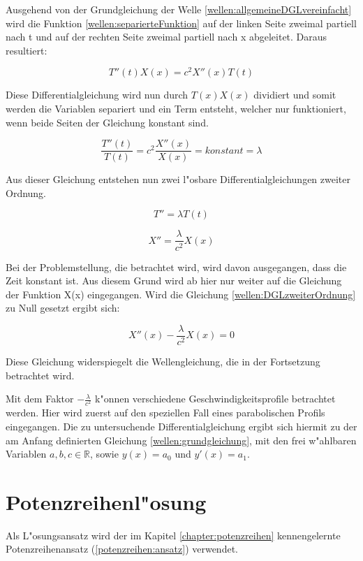 \begin{refsection}
Ausgehend von der Grundgleichung der Welle 
\ref{wellen:allgemeineDGLvereinfacht} wird die Funktion 
\ref{wellen:separierteFunktion} auf der linken Seite zweimal partiell nach t 
und auf der rechten Seite zweimal partiell nach x abgeleitet. Daraus resultiert:

\begin{equation}
	T''(t) X(x) = c^2 X''(x)T(t)
\end{equation}

Diese Differentialgleichung wird nun durch $T(x)X(x)$ dividiert und somit 
werden die Variablen separiert und ein Term entsteht, welcher nur funktioniert, 
wenn beide Seiten der Gleichung konstant sind. 

\begin{equation}
	\frac{T''(t)}{T(t)}
	=
	c^2 \frac{X''(x)}{X(x)} = konstant = \lambda
\end{equation}

Aus dieser Gleichung entstehen nun zwei l"osbare Differentialgleichungen 
zweiter Ordnung.

\begin{equation}
	T''= \lambda T(t)
\end{equation}

\begin{equation}
	X''=\frac{\lambda}{c^2}X(x)
	\label{wellen:DGLzweiterOrdnung}
\end{equation}

Bei der Problemstellung, die betrachtet wird, wird davon ausgegangen, dass die 
Zeit konstant ist. Aus diesem Grund wird ab hier nur weiter auf die Gleichung 
der Funktion X(x) eingegangen. Wird die Gleichung 
\ref{wellen:DGLzweiterOrdnung} zu Null gesetzt ergibt sich:

\begin{equation}
	X''(x) -
	\frac{\lambda}{c^2} X(x)
	=0
\end{equation}

Diese Gleichung widerspiegelt die Wellengleichung, die in der Fortsetzung 
betrachtet wird. 

Mit dem Faktor $-\frac{\lambda}{c^2}$ k"onnen verschiedene 
Geschwindigkeitsprofile betrachtet werden. Hier wird zuerst auf den speziellen 
Fall eines parabolischen Profils eingegangen. Die zu untersuchende 
Differentialgleichung ergibt sich hiermit zu der am Anfang definierten 
Gleichung \ref{wellen:grundgleichung}, mit den frei w"ahlbaren Variablen 
${a,b,c} \in \mathbb{R}$, sowie $y(x) = a_0$ und $y'(x) = a_1$.

\section{Potenzreihenl"osung}
Als L"osungsansatz wird der im Kapitel \ref{chapter:potenzreihen} 
kennengelernte Potenzreihenansatz (\ref{potenzreihen:ansatz}) verwendet.


\end{refsection}

